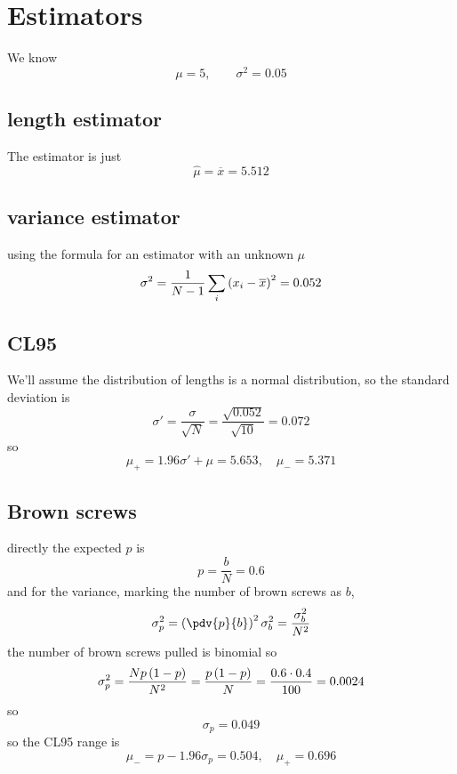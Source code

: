 \clearpage
\section{Estimators}
We know 
\begin{equation}
	\mu=5,\qquad \sigma^2=0.05
\end{equation}
\subsection{length estimator}
The estimator is just
\begin{equation}
	\hat{\mu}=\overline{x} = 5.512
\end{equation}
\subsection{variance estimator}
using the formula for an estimator with an unknown \(\mu\)
\begin{equation}
	\sigma^2=\frac{1}{N-1}\sum_i\left(x_i-\overline{x}\right)^2=0.052
\end{equation}
\subsection{CL95}
We'll assume the distribution of lengths is a normal distribution, so the standard deviation is 
\begin{equation}
	\sigma' = \frac{\sigma}{\sqrt{N}}=\frac{\sqrt{0.052}}{\sqrt{10}}=0.072
\end{equation}
so 
\begin{equation}
	\mu_+=1.96\sigma'+\mu=5.653,\quad \mu_-=5.371
\end{equation}
\subsection{Brown screws}
directly the expected \(p\) is 
\begin{equation}
	p = \frac{b}{N}=0.6
\end{equation}
and for the variance, marking the number of brown screws as \(b\),
\begin{equation}
	\sigma_p^2=\ins{\pdv{p}{b}}^2\sigma_b^2=\frac{\sigma_b^2}{N^2}
\end{equation}
the number of brown screws pulled is binomial so 
\begin{equation}
	\sigma_p^2 = \frac{Np\left(1-p\right)}{N^2}=\frac{p\left(1-p\right)}{N}=\frac{0.6\cdot0.4}{100}=0.0024
\end{equation}
so 
\begin{equation}
	\sigma_p = 0.049
\end{equation}
so the CL95 range is 
\begin{equation}
	\mu_-=p-1.96\sigma_p=0.504,\quad\mu_+=0.696
\end{equation}